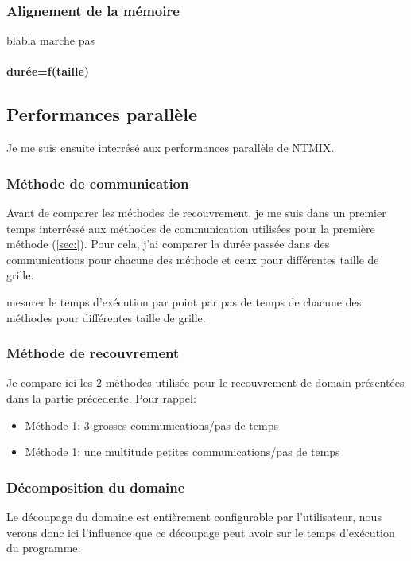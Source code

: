 \subsubsection{Alignement de la mémoire}
blabla marche pas

\paragraph{durée=f(taille)}


\subsection{Performances parallèle}
Je me suis ensuite interrésé aux performances parallèle de NTMIX.

\subsubsection{Méthode de communication}
Avant de comparer les méthodes de recouvrement, je me suis dans un premier temps interréssé aux méthodes de communication utilisées pour la première méthode (\ref{sec:}). Pour cela, j'ai comparer la durée passée dans des communications pour chacune des méthode et ceux pour différentes taille de grille.


mesurer le temps d'exécution par point par pas de temps de chacune des méthodes pour différentes taille de grille.


\subsubsection{Méthode de recouvrement}
Je compare ici les 2 méthodes utilisée pour le recouvrement de domain présentées dans la partie précedente. Pour rappel: 
\begin{itemize}
\item Méthode 1: 3 grosses communications/pas de temps
\item Méthode 1: une multitude petites communications/pas de temps
  
\end{itemize}




\subsubsection{Décomposition du domaine}
Le découpage du domaine est entièrement configurable par l'utilisateur, nous verons donc ici l'influence que ce découpage peut avoir sur le temps d'exécution du programme. 
